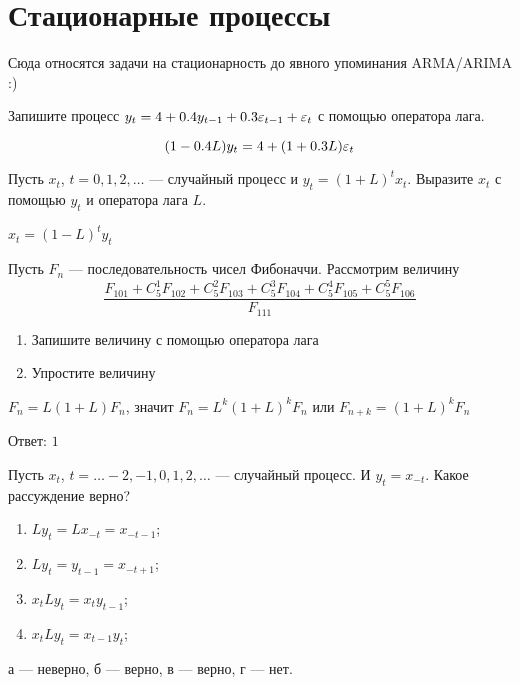 

\chapter{Стационарные процессы}

Сюда относятся задачи на стационарность до явного упоминания ARMA/ARIMA :)

\begin{problem}
Запишите процесс $y_t = 4 + 0.4y_{t-1} + 0.3\varepsilon_{t-1} + \varepsilon_t$ с помощью оператора лага.
\begin{sol}
\[
(1 - 0.4L)y_t = 4 + (1 + 0.3L)\varepsilon_t
\]
\end{sol}
\end{problem}


\begin{problem}
Пусть $x_{t}$, $t=0,1,2, \ldots$ — случайный процесс и $y_{t}=(1+L)^{t}x_{t}$.
Выразите $x_{t}$ с помощью $y_{t}$ и оператора лага $L$.

\begin{sol}
$x_{t}=(1-L)^{t}y_{t}$
\end{sol}
\end{problem}

\begin{problem}
Пусть $ F_{n} $ — последовательность чисел Фибоначчи. Рассмотрим величину
\[
\frac{F_{101}+C^{1}_{5}F_{102}+C^{2}_{5}F_{103}+C^{3}_{5}F_{104}+C^{4}_{5}F_{105}+C^{5}_{5}F_{106}}
{F_{111}}
\]
\begin{enumerate}
\item Запишите величину с помощью оператора лага
\item Упростите величину
\end{enumerate}

\begin{sol}
$ F_{n}=L(1+L)F_{n} $, значит $ F_{n}=L^{k}(1+L)^{k}F_{n} $ или $ F_{n+k}=(1+L)^{k}F_{n} $

Ответ: $1$
\end{sol}
\end{problem}




\begin{problem}
Пусть $x_{t}$, $t=\ldots -2,-1,0,1,2,\ldots $ — случайный процесс. И $y_{t}=x_{-t}$. Какое рассуждение верно?

\begin{enumerate}
\item $Ly_{t}=Lx_{-t}=x_{-t-1}$;
\item $Ly_{t}=y_{t-1}=x_{-t+1}$;
\item $x_t L y_t = x_t y_{t-1}$;
\item $x_t L y_t = x_{t-1} y_t$;
\end{enumerate}
\begin{sol}
а — неверно, б — верно, в — верно, г — нет.
\end{sol}
\end{problem}

